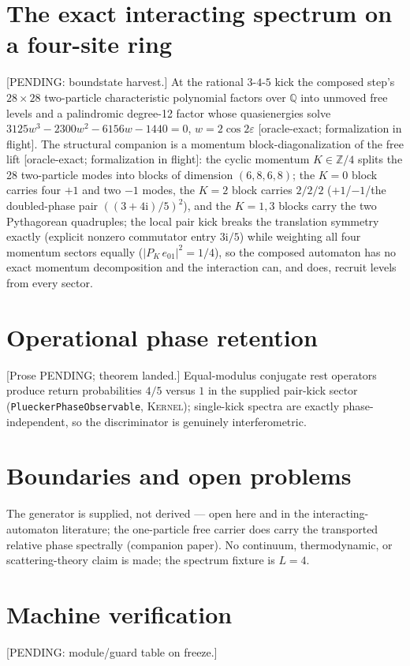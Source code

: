 \documentclass[11pt]{article}
\newcommand{\ii}{\mathrm{i}}
\newcommand{\Kernel}{\textcolor{kernelcolor}{\textsc{Kernel}}}
\begin{document}
\section{The exact interacting spectrum on a four-site ring}
[PENDING: boundstate harvest.]  At the rational $3$-$4$-$5$ kick the
composed step's $28\times28$ two-particle characteristic polynomial
factors over $\mathbb{Q}$ into unmoved free levels and a palindromic
degree-12 factor whose quasienergies solve
$3125w^3-2300w^2-6156w-1440=0$, $w=2\cos2\varepsilon$ [oracle-exact;
formalization in flight].  The structural companion is a momentum
block-diagonalization of the free lift [oracle-exact; formalization in
flight]: the cyclic momentum $K\in\mathbb{Z}/4$ splits the 28
two-particle modes into blocks of dimension $(6,8,6,8)$; the $K=0$ block
carries four $+1$ and two $-1$ modes, the $K=2$ block carries $2/2/2$
($+1$/$-1$/the doubled-phase pair $((3+4\ii)/5)^2$), and the $K=1,3$
blocks carry the two Pythagorean quadruples; the local pair kick breaks
the translation symmetry exactly (explicit nonzero commutator entry
$3\ii/5$) while weighting all four momentum sectors equally
($|P_K\,e_{01}|^2=1/4$), so the composed automaton has no exact momentum
decomposition and the interaction can, and does, recruit levels from
every sector.

\section{Operational phase retention}
[Prose PENDING; theorem landed.]  Equal-modulus conjugate rest operators
produce return probabilities $4/5$ versus $1$ in the supplied pair-kick
sector (\texttt{PlueckerPhaseObservable}, \Kernel{}); single-kick
spectra are exactly phase-independent, so the discriminator is genuinely
interferometric.

\section{Boundaries and open problems}
The generator is supplied, not derived --- open here and in the
interacting-automaton literature; the one-particle free carrier does
carry the transported relative phase spectrally (companion paper).
No continuum, thermodynamic, or scattering-theory claim is made; the
spectrum fixture is $L=4$.

\appendix
\section{Machine verification}
[PENDING: module/guard table on freeze.]
\end{document}
